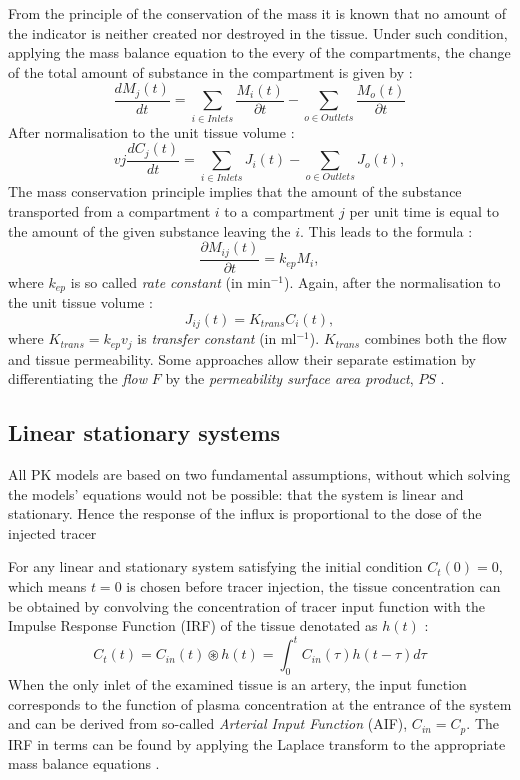 From the principle of the conservation of the mass it is known that no amount of the indicator is neither created nor destroyed in the tissue. Under such condition, applying the mass balance equation to the every of the compartments, the change of the total amount of substance in the compartment is given by \cite{thesis}:
\begin{equation}
\frac{dM_j(t)}{dt} = \sum_{i \in Inlets}\frac{M_i(t)}{\partial t}-\sum_{o \in Outlets}\frac{M_o(t)}{\partial t} 
\label{eq:pk4}
\end{equation}
After normalisation to the unit tissue volume \cite{thesis}:
\begin{equation}
vj\frac{dC_j(t)}{dt} = \sum_{i \in Inlets}J_i(t)-\sum_{o \in Outlets}J_o(t) ,
\label{eq:pk5}
\end{equation}
The mass conservation principle implies that the amount of the substance transported from a compartment $i$ to a compartment $j$ per unit time is equal to the amount of the given substance leaving the $i$. This leads to the formula \cite{thesis}:
\begin{equation}
\frac{\partial M_{ij}(t)}{\partial t} = k_{ep}M_i,
\label{eq:pk6}
\end{equation}
where $k_{ep}$ is so called \textit{rate constant} (in min$^{-1}$). Again, after the normalisation to the unit tissue volume \cite{thesis}:
\begin{equation}
J_{ij}(t) = K_{trans}C_i(t),
\label{eq:pk7}
\end{equation}
where $K_{trans}=k_{ep}v_j$ is \textit{transfer constant} (in ml$^{-1}$). $K_{trans}$ combines both the flow and tissue permeability. Some approaches allow their separate estimation by differentiating the \textit{flow} $F$ by the \textit{permeability surface area product}, $PS$ \cite{thesis}. 

\subsection{Linear stationary systems}
All PK models are based on two fundamental assumptions, without which solving the models' equations would not be possible: that the system is linear and stationary. Hence the response of the influx is proportional to the dose of the injected tracer \cite{thesis, sourbron2011scope} 

For any linear and stationary system satisfying the 
initial condition $C_t(0) = 0$, which means $t = 0$ is chosen before tracer injection,
the tissue concentration can be obtained by convolving the concentration of tracer input function with the Impulse Response Function (IRF) of the tissue denotated as $h(t)$ \cite{sourbron2011scope}: 
\begin{equation}
	\label{eq:convolution}
	C_{t}(t) = C_{in}(t)\circledast h(t) = \int_{0}^{t}C_{in}(\tau)h(t-\tau)d\tau 
\end{equation}
When the only inlet of the examined tissue is an artery, the input function corresponds to the function of plasma concentration at the entrance of the system and can be derived from so-called \textit{Arterial Input Function} (AIF), $C_{in} = C_{p}$. The IRF in terms can be found by applying the Laplace transform to the appropriate mass balance equations \cite{thesis}.
\newpage

